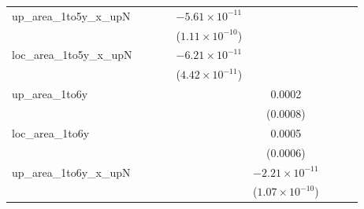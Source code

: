 \begin{tabular}{lcccccccc}
   up\_area\_1to5y\_x\_upN      &                          &                          &                          & $-5.61\times 10^{-11}$   &                               &                          &                          &   \\   
                                &                          &                          &                          & ($1.11\times 10^{-10}$)  &                               &                          &                          &   \\   
   loc\_area\_1to5y\_x\_upN     &                          &                          &                          & $-6.21\times 10^{-11}$   &                               &                          &                          &   \\   
                                &                          &                          &                          & ($4.42\times 10^{-11}$)  &                               &                          &                          &   \\   
   up\_area\_1to6y              &                          &                          &                          &                          & 0.0002                        &                          &                          &   \\   
                                &                          &                          &                          &                          & (0.0008)                      &                          &                          &   \\   
   loc\_area\_1to6y             &                          &                          &                          &                          & 0.0005                        &                          &                          &   \\   
                                &                          &                          &                          &                          & (0.0006)                      &                          &                          &   \\   
   up\_area\_1to6y\_x\_upN      &                          &                          &                          &                          & $-2.21\times 10^{-11}$        &                          &                          &   \\   
                                &                          &                          &                          &                          & ($1.07\times 10^{-10}$)       &                          &                          &   \\   

\end{tabular}
